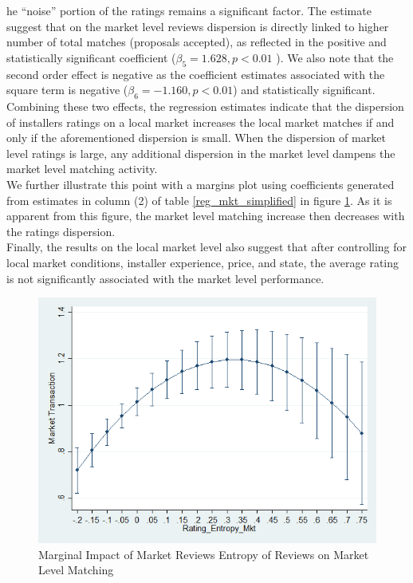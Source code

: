 \documentclass[msom,blindrev]{informs3}
\begin{document}
he ``noise'' portion of the ratings remains a significant factor. The estimate suggest that on the market level reviews dispersion is directly linked to higher number of total matches (proposals accepted), as reflected in the positive and statistically significant coefficient ($\beta_{5}=1.628,p<0.01$ ). We also note that the second order effect is negative as the coefficient estimates associated with the square term is negative ($\beta_{6}=-1.160,p<0.01$) and statistically significant. Combining these two effects, the regression estimates indicate that the dispersion of installers ratings on a local market increases the local market matches if and only if the aforementioned dispersion is small. When the dispersion of market level ratings is large, any additional dispersion in the market level dampens the market level matching activity.\\
We further illustrate this point with a margins plot using coefficients generated from estimates in column (2) of table \ref{reg_mkt_simplified} in figure \ref{marginsplot_mkt_entmkt}. As it is apparent from this figure, the market level matching increase then decreases with the ratings dispersion.\\

Finally, the results on the local market level also suggest that after controlling for local market conditions, installer experience, price, and state, the average rating is not significantly associated with the market level performance.
\begin{figure}
	\centering
	\includegraphics[width=0.7\linewidth]{marginsplot_entmkt.png}
	\caption{Marginal Impact of Market Reviews Entropy of Reviews on Market Level Matching}
	\label{marginsplot_mkt_entmkt}
\end{figure}
\end{document}

